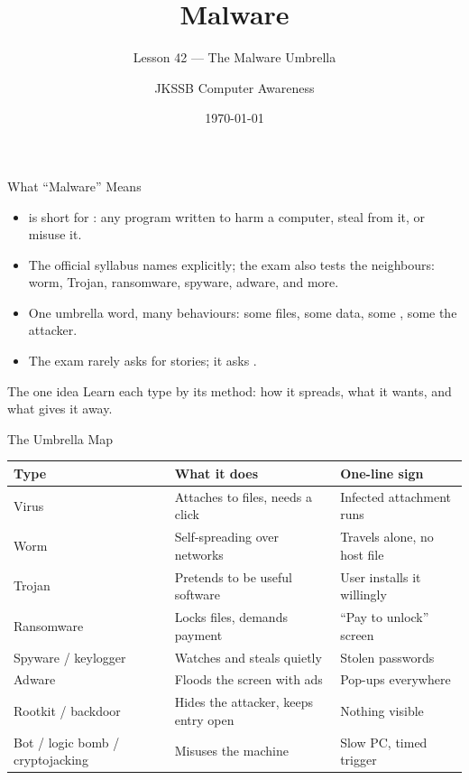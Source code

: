 \documentclass[aspectratio=169]{beamer}
\title{Malware}
\subtitle{Lesson 42 --- The Malware Umbrella}
\author{JKSSB Computer Awareness}
\date{\today}
\begin{document}
\frame{\titlepage}

\begin{frame}{What ``Malware'' Means}
  \begin{itemize}
    \item {} is short for : any program
      written to harm a computer, steal from it, or misuse it.
    \item The official syllabus names  explicitly; the exam also tests the neighbours: worm,
      Trojan, ransomware, spyware, adware, and more.
    \item One umbrella word, many behaviours: some  files, some
       data, some , some  the attacker.
    \item The exam rarely asks for stories; it asks .
  \end{itemize}
  \begin{block}{The one idea}
    Learn each type by its method: how it spreads, what it wants, and what
    gives it away.
  \end{block}
\end{frame}

\begin{frame}{The Umbrella Map}
  \begin{center}
    \begin{tabular}{p{}p{}p{}}
      \toprule
      \textbf{Type} & \textbf{What it does} & \textbf{One-line sign} \\
      \midrule
      Virus & Attaches to files, needs a click & Infected attachment runs \\
      Worm & Self-spreading over networks & Travels alone, no host file \\
      Trojan & Pretends to be useful software & User installs it willingly \\
      Ransomware & Locks files, demands payment & ``Pay to unlock'' screen \\
      Spyware / keylogger & Watches and steals quietly & Stolen passwords \\
      Adware & Floods the screen with ads & Pop-ups everywhere \\
      Rootkit / backdoor & Hides the attacker, keeps entry open & Nothing visible \\
      Bot / logic bomb / cryptojacking & Misuses the machine & Slow PC, timed trigger \\
      \bottomrule
    \end{tabular}
  \end{center}
  \vspace{0.25cm}
\end{frame}
\end{document}
